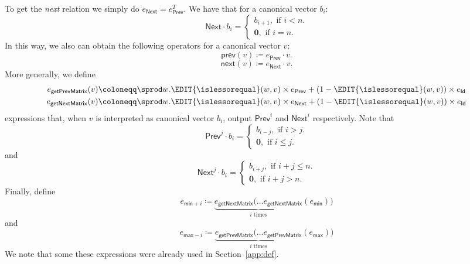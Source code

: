 To get the \textit{next} relation we simply do $e_{\mathsf{Next}} = e_{\mathsf{Prev}}^T$. We have that for a canonical vector $b_i$:
\[
{\mathsf{Next}}\cdot b_i=\begin{cases}
               b_{i+1}, \text{ if } i < n. \\
              \mathbf{0}, \text{ if } i = n.
            \end{cases}
\]
In this way, we also can obtain the following operators for a canonical vector $v$: 
$$\mathsf{prev}(v)\coloneqq e_{\mathsf{Prev}}\cdot v.$$
$$\mathsf{next}(v)\coloneqq e_{\mathsf{Next}}\cdot v.$$
More generally, we define 
\begin{align*}
    e_{\mathsf{getPrevMatrix}}(v)&\coloneqq \sprod w.  \EDIT{\islessorequal}(w,v)\times e_{\mathsf{Prev}} + (1 - \EDIT{\islessorequal}(w,v))\times e_{\mathsf{Id}}\\
    e_{\mathsf{getNextMatrix}}(v)&\coloneqq \sprod w. \EDIT{\islessorequal}(w,v)\times e_{\mathsf{Next}} + (1 - \EDIT{\islessorequal}(w,v))\times e_{\mathsf{Id}}
\end{align*}
expressions that, when $v$ is interpreted as canonical vector $b_i$, output $\mathsf{Prev}^i$ and $\mathsf{Next}^i$ respectively.
Note that
\[
\mathsf{Prev}^j\cdot b_i=\begin{cases}
               b_{i-j}, \text{ if } i > j. \\
              \mathbf{0}, \text{ if } i \leq j.
            \end{cases}
\]
and
\[
\mathsf{Next}^j\cdot b_i=\begin{cases}
               b_{i+j}, \text{ if } i + j \leq n. \\
              \mathbf{0}, \text{ if } i + j > n.
            \end{cases}
\]
Finally, define
$$
e_{\mathsf{min}+i}\coloneqq \underbrace{e_{\mathsf{getNextMatrix}}(\ldots e_{\mathsf{getNextMatrix}}}_{i \text{ times}}(e_{\mathsf{min}}))
$$
and
$$
e_{\mathsf{max}-i}\coloneqq \underbrace{e_{\mathsf{getPrevMatrix}}(\ldots e_{\mathsf{getPrevMatrix}}}_{i \text{ times}}(e_{\mathsf{max}}))
$$
We note that some these expressions were already used in Section~\ref{app:def}.